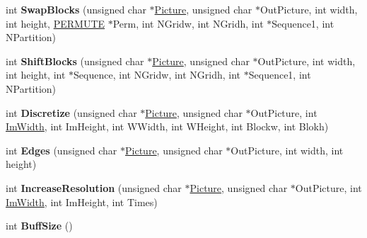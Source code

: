 \begin{DoxyCompactItemize}
\item 
int {\bfseries Swap\+Blocks} (unsigned char $\ast$\hyperlink{classDraw_a45ed15a0527d5ba75107645dc8467078}{Picture}, unsigned char $\ast$Out\+Picture, int width, int height, \hyperlink{structPERMUTE}{P\+E\+R\+M\+U\+TE} $\ast$Perm, int N\+Gridw, int N\+Gridh, int $\ast$Sequence1, int N\+Partition)\hypertarget{classDrEffect_aa3c03c8d0fad03bed05a7b4ed578c7f8}{}\label{classDrEffect_aa3c03c8d0fad03bed05a7b4ed578c7f8}

\item 
int {\bfseries Shift\+Blocks} (unsigned char $\ast$\hyperlink{classDraw_a45ed15a0527d5ba75107645dc8467078}{Picture}, unsigned char $\ast$Out\+Picture, int width, int height, int $\ast$Sequence, int N\+Gridw, int N\+Gridh, int $\ast$Sequence1, int N\+Partition)\hypertarget{classDrEffect_a8297413646e4367507222838aee867fd}{}\label{classDrEffect_a8297413646e4367507222838aee867fd}

\item 
int {\bfseries Discretize} (unsigned char $\ast$\hyperlink{classDraw_a45ed15a0527d5ba75107645dc8467078}{Picture}, unsigned char $\ast$Out\+Picture, int \hyperlink{classDraw_ab92a87c2480115eaf15a27a8fa0cd965}{Im\+Width}, int Im\+Height, int W\+Width, int W\+Height, int Blockw, int Blokh)\hypertarget{classDrEffect_a32440e0fb7b50f5934cda4d6b8af5cf6}{}\label{classDrEffect_a32440e0fb7b50f5934cda4d6b8af5cf6}

\item 
int {\bfseries Edges} (unsigned char $\ast$\hyperlink{classDraw_a45ed15a0527d5ba75107645dc8467078}{Picture}, unsigned char $\ast$Out\+Picture, int width, int height)\hypertarget{classDrEffect_a8dfc2959f3fc3f77fa6fcba0d5a6ba0a}{}\label{classDrEffect_a8dfc2959f3fc3f77fa6fcba0d5a6ba0a}

\item 
int {\bfseries Increase\+Resolution} (unsigned char $\ast$\hyperlink{classDraw_a45ed15a0527d5ba75107645dc8467078}{Picture}, unsigned char $\ast$Out\+Picture, int \hyperlink{classDraw_ab92a87c2480115eaf15a27a8fa0cd965}{Im\+Width}, int Im\+Height, int Times)\hypertarget{classDrEffect_a5e807a9bb2fd73525054fdc5bbe2722d}{}\label{classDrEffect_a5e807a9bb2fd73525054fdc5bbe2722d}

\item 
int {\bfseries Buff\+Size} ()\hypertarget{classDrEffect_aebc416ae6d83d469837a19a3080555a1}{}\label{classDrEffect_aebc416ae6d83d469837a19a3080555a1}

\end{DoxyCompactItemize}

